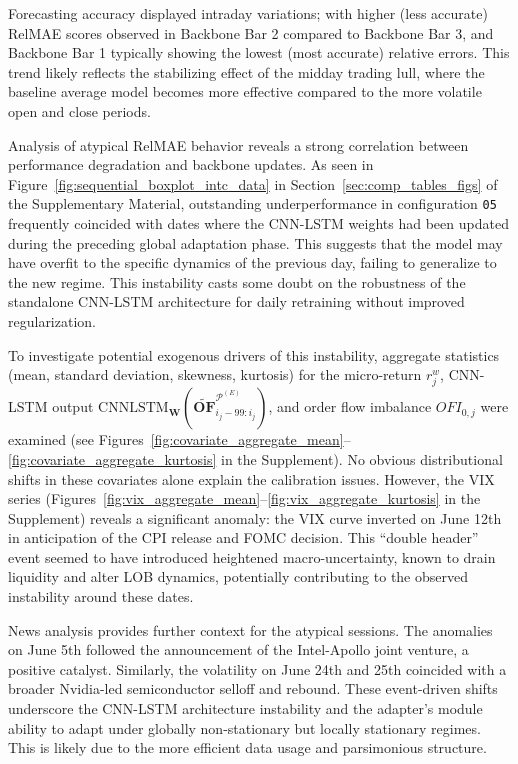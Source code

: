 \documentclass{rQUF2e}
\theoremstyle{plain}
\theoremstyle{definition}
\theoremstyle{remark}
\begin{document}
Forecasting accuracy displayed intraday variations; with higher (less accurate) RelMAE scores observed in Backbone Bar 2 compared to Backbone Bar 3, and Backbone Bar 1 typically showing the lowest (most accurate) relative errors. This trend likely reflects the stabilizing effect of the midday trading lull, where the baseline average model becomes more effective compared to the more volatile open and close periods.

Analysis of atypical RelMAE behavior reveals a strong correlation between performance degradation and backbone updates. As seen in Figure~\ref{fig:sequential_boxplot_intc_data} in Section~\ref{sec:comp_tables_figs} of the Supplementary Material, outstanding underperformance in configuration \texttt{05} frequently coincided with dates where the CNN-LSTM weights had been updated during the preceding global adaptation phase. This suggests that the model may have overfit to the specific dynamics of the previous day, failing to generalize to the new regime. This instability casts some doubt on the robustness of the standalone CNN-LSTM architecture for daily retraining without improved regularization.

To investigate potential exogenous drivers of this instability, aggregate statistics (mean, standard deviation, skewness, kurtosis) for the micro-return $r^w_j$, CNN-LSTM output $\mathrm{CNNLSTM}_{\mathbf{W}}\!\left(\widetilde{\mathbf{OF}}^{\mathcal{P}^{(E)}}_{i_{j}-99:i_{j}}\right)$, and order flow imbalance $OFI_{0, j}$ were examined (see Figures~\ref{fig:covariate_aggregate_mean}--\ref{fig:covariate_aggregate_kurtosis} in the Supplement). No obvious distributional shifts in these covariates alone explain the calibration issues. However, the VIX series (Figures~\ref{fig:vix_aggregate_mean}--\ref{fig:vix_aggregate_kurtosis} in the Supplement) reveals a significant anomaly: the VIX curve inverted on June 12th in anticipation of the CPI release and FOMC decision. This ``double header'' event seemed to have introduced heightened macro-uncertainty, known to drain liquidity and alter LOB dynamics, potentially contributing to the observed instability around these dates.

News analysis provides further context for the atypical sessions. The anomalies on June 5th followed the announcement of the Intel-Apollo joint venture, a positive catalyst. Similarly, the volatility on June 24th and 25th coincided with a broader Nvidia-led semiconductor selloff and rebound. These event-driven shifts underscore the CNN-LSTM architecture instability and the adapter's module ability to adapt under globally non-stationary but locally stationary regimes. This is likely due to the more efficient data usage and parsimonious structure.
\end{document}
